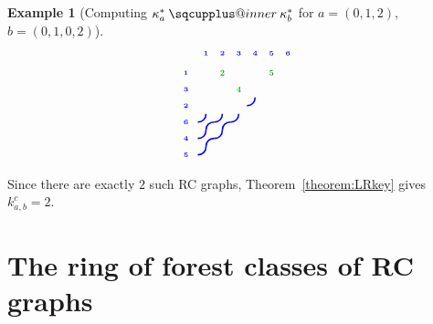 \documentclass{amsart}
\makeatletter
\newcommand{\sqcupplus@inner}[2]{%
  \vcenter{\hbox{\ooalign{%
    \hfil$\m@th#1\sqcup$\hfil\cr
    \hfil\raisebox{0.15ex}{$\m@th#1\scriptscriptstyle+$}\hfil\cr
  }}}%
}
\newcommand{\sqcupplus}{\mathbin{\mathpalette\sqcupplus@inner\relax}}
\theoremstyle{definition}
\newtheorem{example}[lemma]{Example}
\theoremstyle{remark}
\numberwithin{equation}{subsection}
\makeatother
\begin{document}
\begin{example}[Computing $\kappa_a^*\sqcupplus\kappa_b^*$ for $a=(0,1,2)$, $b=(0,1,0,2)$]
$$\begin{tikzpicture}[scale=0.45, baseline=(current bounding box.center)]
  \draw[blue, line width=1.125pt] (3.3,3.5) .. controls (3.6,3.5) and (3.8,3.7) .. (3.8,4);
  \draw[blue, line width=1.125pt] (0.3,2.5) .. controls (0.6,2.5) and (0.8,2.7) .. (0.8,3);
  \draw[blue, line width=1.125pt] (0.8,2) .. controls (0.8,2.3) and (1,2.5) .. (1.3,2.5);
  \draw[blue, line width=1.125pt] (1.3,2.5) .. controls (1.6,2.5) and (1.8,2.7) .. (1.8,3);
  \draw[blue, line width=1.125pt] (1.8,2) .. controls (1.8,2.3) and (2,2.5) .. (2.3,2.5);
  \draw[blue, line width=1.125pt] (2.3,2.5) .. controls (2.6,2.5) and (2.8,2.7) .. (2.8,3);
  \draw[blue, line width=1.125pt] (0.3,1.5) .. controls (0.6,1.5) and (0.8,1.7) .. (0.8,2);
  \draw[blue, line width=1.125pt] (0.8,1) .. controls (0.8,1.3) and (1,1.5) .. (1.3,1.5);
  \draw[blue, line width=1.125pt] (1.3,1.5) .. controls (1.6,1.5) and (1.8,1.7) .. (1.8,2);
  \draw[blue, line width=1.125pt] (0.3,0.5) .. controls (0.6,0.5) and (0.8,0.7) .. (0.8,1);
  \node[font=\tiny\bfseries, text=blue, anchor=south] at (0.8,6.3) {1};
  \node[font=\tiny\bfseries, text=blue, anchor=south] at (1.8,6.3) {2};
  \node[font=\tiny\bfseries, text=blue, anchor=south] at (2.8,6.3) {3};
  \node[font=\tiny\bfseries, text=blue, anchor=south] at (3.8,6.3) {4};
  \node[font=\tiny\bfseries, text=blue, anchor=south] at (4.8,6.3) {5};
  \node[font=\tiny\bfseries, text=blue, anchor=south] at (5.8,6.3) {6};
  \node[font=\tiny\bfseries, text=blue, anchor=east] at (0,5.5) {1};
  \node[font=\tiny\bfseries, text=blue, anchor=east] at (0,4.5) {3};
  \node[font=\tiny\bfseries, text=blue, anchor=east] at (0,3.5) {2};
  \node[font=\tiny\bfseries, text=blue, anchor=east] at (0,2.5) {6};
  \node[font=\tiny\bfseries, text=blue, anchor=east] at (0,1.5) {4};
  \node[font=\tiny\bfseries, text=blue, anchor=east] at (0,0.5) {5};
  \node[font=\Large\bfseries, text=green!60!black, fill=white, inner sep=0.5pt, circle, transform shape] at (1.8,5.5) {2};
  \node[font=\Large\bfseries, text=green!60!black, fill=white, inner sep=0.5pt, circle, transform shape] at (4.8,5.5) {5};
  \node[font=\Large\bfseries, text=green!60!black, fill=white, inner sep=0.5pt, circle, transform shape] at (2.8,4.5) {4};
\end{tikzpicture}
$$

Since there are exactly $2$ such RC graphs, Theorem~\ref{theorem:LRkey} gives $k_{a,b}^c = 2$.
\end{example}



\section{The ring of forest classes of RC graphs}\label{section:forest}
\end{document}

